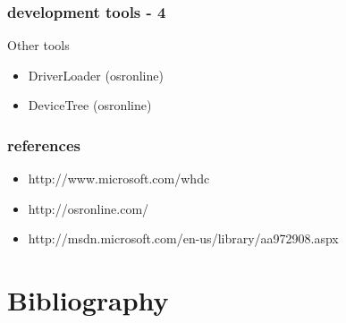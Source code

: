 
\begin{frame}
 \frametitle{development tools - 4}

 Other tools

 \begin{itemize}
  \item DriverLoader (osronline)
  \item DeviceTree (osronline)
 \end{itemize}
\end{frame}


\begin{frame}
 \frametitle{references}

 \begin{itemize}
  \item http://www.microsoft.com/whdc
  \item http://osronline.com/
  \item http://msdn.microsoft.com/en-us/library/aa972908.aspx
 \end{itemize}

\end{frame}


%
%

\section{Bibliography}


